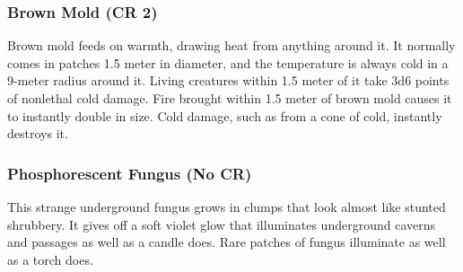 \subsubsection{Brown Mold (CR 2)}
Brown mold feeds on warmth, drawing heat from anything around it. It normally comes in patches 1.5 meter in diameter, and the temperature is always cold in a 9-meter radius around it. Living creatures within 1.5 meter of it take 3d6 points of nonlethal cold damage. Fire brought within 1.5 meter of brown mold causes it to instantly double in size. Cold damage, such as from a cone of cold, instantly destroys it.

\subsubsection{Phosphorescent Fungus (No CR)}
This strange underground fungus grows in clumps that look almost like stunted shrubbery. It gives off a soft violet glow that illuminates underground caverns and passages as well as a candle does. Rare patches of fungus illuminate as well as a torch does.
